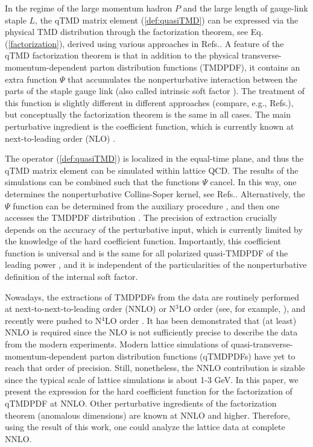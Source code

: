 \documentclass[aps,prl,twocolumn,secnumarabic,notitlepage,superscriptaddress,nofootinbib,tightenlines,floatfix,preprintnumbers]{revtex4-1}
\renewcommand{\(}{\left(}
\renewcommand{\)}{\right)}
\renewcommand{\[}{\left[}
\renewcommand{\]}{\right]}
\begin{document}
In the regime of the large momentum hadron $P$ and the large length of gauge-link staple $L$, the qTMD matrix element (\ref{def:quasiTMD}) can be expressed via the physical TMD distribution through the factorization theorem, see Eq. (\ref{factorization}), derived using various approaches in Refs.\cite{Ebert:2019tvc, Ji:2019sxk, Ji:2019ewn, Vladimirov:2020ofp, Ebert:2020gxr, Ebert:2022fmh, Rodini:2022wic}. A feature of the qTMD factorization theorem is that in addition to the physical transverse-momentum-dependent parton distribution functions (TMDPDF), it contains an extra function $\Psi$ that accumulates the nonperturbative interaction between the parts of the staple gauge link (also called intrinsic soft factor \cite{Ji:2019sxk}). The treatment of this function is slightly different in different approaches (compare, e.g., Refs.\cite{Ji:2019ewn, Ebert:2020gxr, Vladimirov:2020ofp}), but conceptually the factorization theorem is the same in all cases. The main perturbative ingredient is the coefficient function, which is currently known at next-to-leading order (NLO) \cite{Ebert:2018gzl, Vladimirov:2020ofp}. 

The operator (\ref{def:quasiTMD}) is localized in the equal-time plane, and thus the qTMD matrix element can be simulated within lattice QCD. The results of the simulations can be combined such that the functions $\Psi$ cancel. In this way, one determines the nonperturbative Collins-Soper kernel, see Refs.\cite{Ebert:2018gzl, LatticeParton:2020uhz, Schlemmer:2021aij, Li:2021wvl, LPC:2022ibr, Shu:2023cot}. Alternatively, the $\Psi$ function can be determined from the auxiliary procedure \cite{Ji:2019sxk}, and then one accesses the TMDPDF distribution \cite{LPC:2022zci}. The precision of extraction crucially depends on the accuracy of the perturbative input, which is currently limited by the knowledge of the hard coefficient function. Importantly, this coefficient function is universal and is the same for all polarized quasi-TMDPDF of the leading power \cite{Vladimirov:2020ofp, Ebert:2020gxr}, and it is independent of the particularities of the nonperturbative definition of the internal soft factor.

Nowadays, the extractions of TMDPDFs from the data are routinely performed at next-to-next-to-leading order (NNLO) or N$^3$LO order (see, for example, \cite{Bertone:2019nxa, Scimemi:2019cmh, Bacchetta:2022awv}), and recently were pushed to N$^4$LO order \cite{INPREP}. It has been demonstrated \cite{Scimemi:2017etj, Bertone:2019nxa, Bacchetta:2022awv} that (at least) NNLO is required since the NLO is not sufficiently precise to describe the data from the modern experiments. Modern lattice simulations of quasi-transverse-momentum-dependent parton distribution functions (qTMDPDFs) have yet to reach that order of precision. Still, nonetheless, the NNLO contribution is sizable since the typical scale of lattice simulations is about 1-3 GeV. In this paper, we present the expression for the hard coefficient function for the factorization of qTMDPDF at NNLO. Other perturbative ingredients of the factorization theorem (anomalous dimensions) are known at NNLO and higher. Therefore, using the result of this work, one could analyze the lattice data at complete NNLO.
\end{document}
